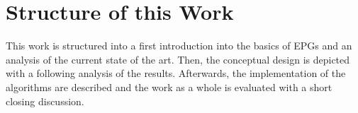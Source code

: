 \section{Structure of this Work}
\label{ch:Intoduction:sec:Structure}
This work is structured into a first introduction into the basics of EPGs and an analysis of the current state of the art. Then, the conceptual design is depicted with a following analysis of the results. Afterwards, the implementation of the algorithms are described and the work as a whole is evaluated with a short closing discussion.  

